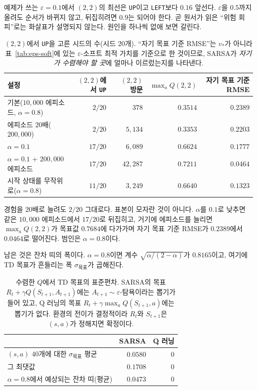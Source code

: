\documentclass[11pt,a4paper]{article}
\begin{document}
예제가 쓰는 $\varepsilon=0.1$에서 $(2,2)$의 최선은 \texttt{UP}이고 \texttt{LEFT}보다 $0.16$
앞선다. $\varepsilon$을 $0.5$까지 올려도 순서가 바뀌지 않고, 뒤집히려면 $0.9$는 되어야 한다.
곧 원서가 읽은 ``위험 회피''로는 화살표가 설명되지 않는다. 원인을 하나씩 없애 보면 갈린다.

\begin{table}[htbp]
\centering
\caption{$(2,2)$에서 \texttt{UP}을 고른 시드의 수(시드 $20$개). ``자기 목표 기준 RMSE''는 $v_*$가
아니라 표~\ref{tab:eps-soft}에 있는 $\varepsilon$-소프트 최적 가치를 기준으로 한 것이므로, SARSA가
\emph{자기가 수렴해야 할 곳}에 얼마나 이르렀는지를 나타낸다.}
\label{tab:sarsa-cause}
\small
\begin{tabular}{@{}lrrrr@{}}
\toprule
설정 & $(2,2)$에서 \texttt{UP} & $(2,2)$ 방문 & $\max_a Q(2,2)$ & 자기 목표 기준 RMSE \\
\midrule
기본($10{,}000$ 에피소드, $\alpha=0.8$) & $2/20$  & $378$    & $0.3514$ & $0.2389$ \\
에피소드 $20$배($200{,}000$)            & $2/20$  & $5{,}134$ & $0.3353$ & $0.2203$ \\
$\alpha=0.1$                            & $17/20$ & $6{,}089$ & $0.6624$ & $0.1777$ \\
$\alpha=0.1$ + $200{,}000$ 에피소드     & $17/20$ & $42{,}287$& $0.7211$ & $0.0464$ \\
시작 상태를 무작위로($\alpha=0.8$)      & $11/20$ & $3{,}249$ & $0.6640$ & $0.1323$ \\
\bottomrule
\end{tabular}
\end{table}

경험을 $20$배로 늘려도 $2/20$ 그대로다. 표본이 모자란 것이 아니다. $\alpha$를 $0.1$로 낮추면 같은
$10{,}000$ 에피소드에서 $17/20$로 뒤집히고, 거기에 에피소드를 늘리면 $\max_a Q(2,2)$가 목표값
$0.7684$에 다가가며 자기 목표 기준 RMSE가 $0.2389$에서 $0.0464$로 떨어진다. 범인은 $\alpha=0.8$이다.

남은 것은 잔차 띠의 폭이다. $\alpha=0.8$이면 계수 $\sqrt{\alpha/(2-\alpha)}$가 $0.8165$이고,
여기에 TD 목표가 흔들리는 폭 $\sigma_{\text{목표}}$가 곱해진다.

\begin{table}[htbp]
\centering
\caption{수렴한 $Q$에서 TD 목표의 표준편차. SARSA의 목표
$R_t + \gamma Q(S_{t+1},A_{t+1})$에는 $A_{t+1} \sim \varepsilon$-탐욕이라는 뽑기가 들어 있고,
Q 러닝의 목표 $R_t + \gamma\max_a Q(S_{t+1},a)$에는 뽑기가 없다. 환경의 전이가 결정적이라
$R_t$와 $S_{t+1}$은 $(s,a)$가 정해지면 확정이다.}
\label{tab:target-sigma}
\small
\begin{tabular}{@{}lrr@{}}
\toprule
 & SARSA & Q 러닝 \\
\midrule
$(s,a)$ $40$개에 대한 $\sigma_{\text{목표}}$ 평균 & $0.0580$ & $0$ \\
그 최댓값                                          & $0.1708$ & $0$ \\
$\alpha=0.8$에서 예상되는 잔차 띠(평균)            & $0.0473$ & $0$ \\
\bottomrule
\end{tabular}
\end{table}
\end{document}
